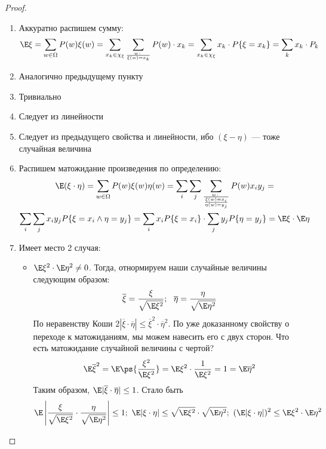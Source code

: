 \begin{proof}~
	\begin{enumerate}
		\item Аккуратно распишем сумму:
		\[
			\E\xi = \sum_{w \in \Omega} P(w)\xi(w) = \sum_{x_k \in \chi_\xi} \sum_{w \colon \over \xi(w) = x_k} P(w) \cdot x_k = \sum_{x_k \in \chi_\xi} x_k \cdot P\{\xi = x_k\} = \sum_k x_k \cdot P_k
		\]
		
		\item Аналогично предыдущему пункту
		
		\item Тривиально
		
		\item Следует из линейности
		
		\item Следует из предыдущего свойства и линейности, ибо $(\xi - \eta)$ --- тоже случайная величина
		
		\item Распишем матожидание произведения по определению:
		\begin{multline*}
			\E(\xi \cdot \eta) = \sum_{w \in \Omega} P(w) \xi(w) \eta(w) = \sum_i \sum_j \sum_{w \colon \over { \xi(w) = x_i \over \eta(w) = y_j}} P(w) x_i y_j =
			\\
			\sum_i \sum_j x_i y_j P\{\xi = x_i \wedge \eta = y_j\} = \sum_i x_i P\{\xi = x_i\} \cdot \sum_j y_j P\{\eta = y_j\} = \E\xi \cdot \E\eta
		\end{multline*}
		
		\item Имеет место 2 случая:
		\begin{itemize}
			\item $\E\xi^2 \cdot \E\eta^2 \neq 0$. Тогда, отнормируем наши случайные величины следующим образом:
			\[
				\overline{\xi} = \frac{\xi}{\sqrt{\E\xi^2}};\ \ \overline{\eta} = \frac{\eta}{\sqrt{\E\eta^2}}
			\]
			По неравенству Коши $2|\overline{\xi} \cdot \overline{\eta}| \le \overline{\xi}^2 \cdot \overline{\eta}^2$. По уже доказанному свойству о переходе к матожиданиям, мы можем навесить его с двух сторон. Что есть матожидание случайной величины с чертой?
			\[
				\E\overline{\xi}^2 = \E\ps{\frac{\xi^2}{\E\xi^2}} = \E\xi^2 \cdot \frac{1}{\E\xi^2} = 1 = \E\overline{\eta}^2
			\]
			Таким образом, $\E|\overline{\xi} \cdot \overline{\eta}| \le 1$. Стало быть
			\[
				\E\left|\frac{\xi}{\sqrt{\E\xi^2}} \cdot \frac{\eta}{\sqrt{\E\eta^2}}\right| \le 1;\ \E|\xi \cdot \eta| \le \sqrt{\E\xi^2} \cdot \sqrt{\E\eta^2};\ (\E|\xi \cdot \eta|)^2 \le \E\xi^2 \cdot \E\eta^2
			\]
			

\end{itemize}
\end{enumerate}
\end{proof}
